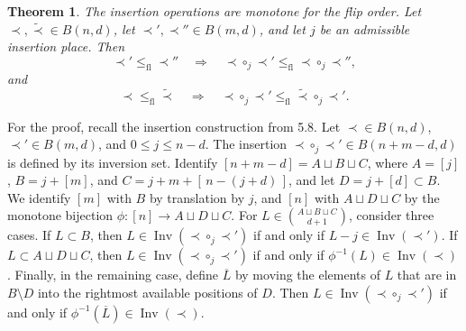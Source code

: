 \documentclass[12pt,a4paper]{article}
\newtheorem{theorem}{Theorem}[section]
\def\bar{\overline}
\def\bar{\overline}
\begin{document}
\begin{theorem}\label{thm:insertion-flip-order}
The insertion operations are monotone for the flip order.  Let
\(\prec, \widetilde{\prec}\in B(n,d)\), let
\(\prec',\prec''\in B(m,d)\), and let \(j\) be an admissible insertion place.  Then
\[
  \prec' \leq_{\mathrm{fl}} \prec''
  \quad\Longrightarrow\quad
  \prec\circ_j\prec' \leq_{\mathrm{fl}} \prec\circ_j\prec'',
\]
and
\[
  \prec \leq_{\mathrm{fl}} \widetilde{\prec}
  \quad\Longrightarrow\quad
  \prec\circ_j\prec' \leq_{\mathrm{fl}} \widetilde{\prec}\circ_j\prec' .
\]
\end{theorem}

For the proof, recall the insertion construction from 5.8.  Let \(\prec\in B(n,d)\),
\(\prec'\in B(m,d)\), and \(0\leq j\leq n-d\).  The insertion
\(\prec\circ_j\prec'\in B(n+m-d,d)\) is defined by its inversion set.  Identify
\([n+m-d]=A\sqcup B\sqcup C\), where \(A=[j]\), \(B=j+[m]\), and
\(C=j+m+[\,n-(j+d)\,]\), and let \(D=j+[d]\subset B\).  We identify \([m]\)
with \(B\) by translation by \(j\), and \([n]\) with \(A\sqcup D\sqcup C\) by the
monotone bijection \(\phi:[n]\to A\sqcup D\sqcup C\).  For
\(L\in\binom{A\sqcup B\sqcup C}{d+1}\), consider three cases.  If \(L\subset B\),
then \(L\in\operatorname{Inv}(\prec\circ_j\prec')\) if and only if
\(L-j\in\operatorname{Inv}(\prec')\).  If \(L\subset A\sqcup D\sqcup C\), then
\(L\in\operatorname{Inv}(\prec\circ_j\prec')\) if and only if
\(\phi^{-1}(L)\in\operatorname{Inv}(\prec)\).  Finally, in the remaining case,
define \(\bar L\) by moving the elements of \(L\) that are in \(B\setminus D\) into
the rightmost available positions of \(D\).  Then
\(L\in\operatorname{Inv}(\prec\circ_j\prec')\) if and only if
\(\phi^{-1}(\bar L)\in\operatorname{Inv}(\prec)\).
\end{document}
